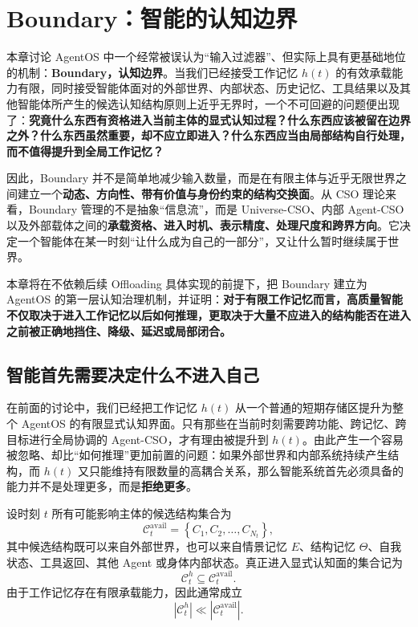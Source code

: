 \chapter{Boundary：智能的认知边界}

\begin{chapterlead}
本章讨论 AgentOS 中一个经常被误认为“输入过滤器”、但实际上具有更基础地位的机制：\textbf{Boundary，认知边界}。当我们已经接受工作记忆 $h(t)$ 的有效承载能力有限，同时接受智能体面对的外部世界、内部状态、历史记忆、工具结果以及其他智能体所产生的候选认知结构原则上近乎无界时，一个不可回避的问题便出现了：\textbf{究竟什么东西有资格进入当前主体的显式认知过程？什么东西应该被留在边界之外？什么东西虽然重要，却不应立即进入？什么东西应当由局部结构自行处理，而不值得提升到全局工作记忆？}

因此，Boundary 并不是简单地减少输入数量，而是在有限主体与近乎无限世界之间建立一个\textbf{动态、方向性、带有价值与身份约束的结构交换面}。从 CSO 理论来看，Boundary 管理的不是抽象“信息流”，而是 Universe-CSO、内部 Agent-CSO 以及外部载体之间的\textbf{承载资格、进入时机、表示精度、处理尺度和跨界方向}。它决定一个智能体在某一时刻“让什么成为自己的一部分”，又让什么暂时继续属于世界。

本章将在不依赖后续 Offloading 具体实现的前提下，把 Boundary 建立为 AgentOS 的第一层认知治理机制，并证明：\textbf{对于有限工作记忆而言，高质量智能不仅取决于进入工作记忆以后如何推理，更取决于大量不应进入的结构能否在进入之前被正确地挡住、降级、延迟或局部闭合。}
\end{chapterlead}

\section{智能首先需要决定什么不进入自己}

在前面的讨论中，我们已经把工作记忆 $h(t)$ 从一个普通的短期存储区提升为整个 AgentOS 的有限显式认知界面。只有那些在当前时刻需要跨功能、跨记忆、跨目标进行全局协调的 Agent-CSO，才有理由被提升到 $h(t)$。由此产生一个容易被忽略、却比“如何推理”更加前置的问题：如果外部世界和内部系统持续产生结构，而 $h(t)$ 又只能维持有限数量的高耦合关系，那么智能系统首先必须具备的能力并不是处理更多，而是\textbf{拒绝更多}。

设时刻 $t$ 所有可能影响主体的候选结构集合为
\[
\mathcal{C}^{\mathrm{avail}}_t
=
\left\{
C_1,C_2,\ldots,C_{N_t}
\right\},
\]
其中候选结构既可以来自外部世界，也可以来自情景记忆 $E$、结构记忆 $\Theta$、自我状态、工具返回、其他 Agent 或身体内部状态。真正进入显式认知面的集合记为
\[
\mathcal{C}^{h}_t
\subseteq
\mathcal{C}^{\mathrm{avail}}_t.
\]
由于工作记忆存在有限承载能力，因此通常成立
\[
\left|
\mathcal{C}^{h}_t
\right|
\ll
\left|
\mathcal{C}^{\mathrm{avail}}_t
\right|.
\]

